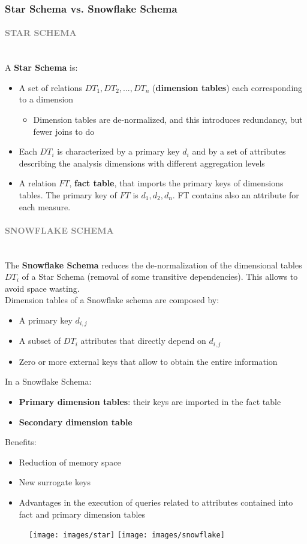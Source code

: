 \documentclass[10pt,a4paper]{article}
\newcommand{\myparagraph}[1]{\paragraph{\normalsize{\textcolor{gray}{\uppercase{\textbf{#1}}}} }\mbox{} \vspace{0.5em}\\}
\begin{document}
\subsubsection{Star Schema vs. Snowflake Schema}
\myparagraph{STAR SCHEMA}
A \textbf{Star Schema} is:
\begin{itemize}
	\item A set of relations $DT_1, DT_2,..., DT_n$ (\textbf{dimension tables}) each corresponding to a dimension
	\begin{itemize}
		\item Dimension tables are de-normalized, and this introduces redundancy, but fewer joins to do
	\end{itemize}
	\item Each $DT_i$ is characterized by a primary key $d_i$ and by a set of attributes describing the analysis dimensions with different aggregation levels
	\item A relation $FT$, \textbf{fact table}, that imports the primary keys of dimensions tables. The primary key of $FT$ is $d_1,d_2,d_n$. FT contains also an attribute for each measure.
\end{itemize}
\myparagraph{SNOWFLAKE SCHEMA}
The \textbf{Snowflake Schema} reduces the de-normalization of the dimensional tables $DT_i$ of a Star Schema (removal of some transitive dependencies). This allows to avoid space wasting. \\
Dimension tables of a Snowflake schema are composed by:
\begin{itemize}
	\item A primary key $d_{i,j}$
	\item A subset of $DT_i$ attributes that directly depend on $d_{i,j}$
	\item Zero or more external keys that allow to obtain the entire information
\end{itemize}
In a Snowflake Schema:
\begin{itemize}
	\item \textbf{Primary dimension tables}: their keys are imported in the fact table
	\item \textbf{Secondary dimension table}
\end{itemize}
Benefits:
\begin{itemize}
	\item Reduction of memory space
	\item New surrogate keys
	\item Advantages in the execution of queries related to attributes contained into fact and primary dimension tables
\end{itemize}
\begin{figure}[htp]
\centering
\texttt{[image: images/star]}\hfill
\texttt{[image: images/snowflake]}\hfill
\end{figure}
\end{document}
